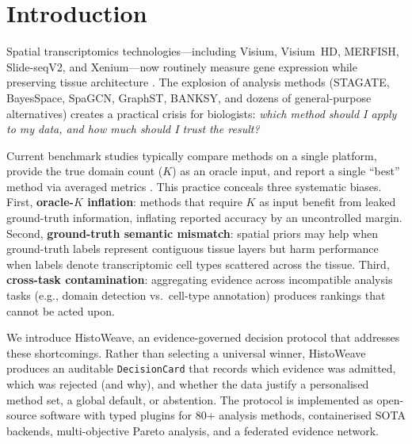 \documentclass[]{bioinfo}
\begin{document}
\maketitle

\section{Introduction}

Spatial transcriptomics technologies---including Visium, Visium~HD,
MERFISH, Slide-seqV2, and Xenium---now routinely measure gene expression
while preserving tissue architecture
\citep{maynard2021,stahl2016,chen2022}. The explosion of analysis
methods (STAGATE, BayesSpace, SpaGCN, GraphST, BANKSY, and dozens of
general-purpose alternatives) creates a practical crisis for biologists:
\textit{which method should I apply to my data, and how much should I
trust the result?}

Current benchmark studies typically compare methods on a single
platform, provide the true domain count (\(K\)) as an oracle input, and
report a single ``best'' method via averaged metrics
\citep{li2023benchmarking}. This practice conceals three systematic
biases. First, \textbf{oracle-\(K\) inflation}: methods that require
\(K\) as input benefit from leaked ground-truth information, inflating
reported accuracy by an uncontrolled margin. Second, \textbf{ground-truth
semantic mismatch}: spatial priors may help when ground-truth labels
represent contiguous tissue layers but harm performance when labels
denote transcriptomic cell types scattered across the tissue. Third,
\textbf{cross-task contamination}: aggregating evidence across
incompatible analysis tasks (e.g., domain detection vs.\ cell-type
annotation) produces rankings that cannot be acted upon.

We introduce HistoWeave, an evidence-governed decision protocol that
addresses these shortcomings. Rather than selecting a universal winner,
HistoWeave produces an auditable \texttt{DecisionCard} that records
which evidence was admitted, which was rejected (and why), and whether
the data justify a personalised method set, a global default, or
abstention. The protocol is implemented as open-source software with
typed plugins for 80+ analysis methods, containerised SOTA backends,
multi-objective Pareto analysis, and a federated evidence network.
\end{document}
